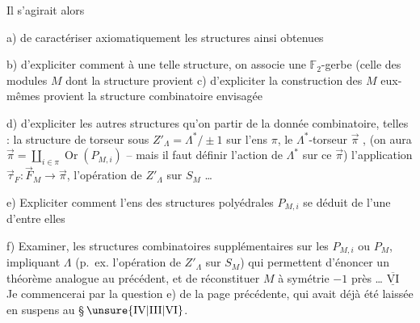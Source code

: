 
Il s'agirait alors

a) de caractériser axiomatiquement les structures ainsi obtenues

b) d'expliciter comment à une telle structure, on associe une $\mathbb F_2$-gerbe
(celle des modules $M$ dont la structure provient
c) d'expliciter la construction des $M$
eux-mêmes  provient la structure
combinatoire envisagée

d) d'expliciter les autres structures qu'on
  partir de la donnée combinatoire, telles : la structure de \deleted{$\Lambda^*$}
torseur sous $Z'_\Lambda=\Lambda^*/\pm1$ sur l'ens $\pi$,
le $\Lambda^*$-torseur $\overrightarrow\pi$ ,
 (on
aura $\overrightarrow\pi=\coprod_{i\in\pi}\operatorname{Or}(P_{M,i})$ -- mais il faut
définir l'action de $\Lambda^*$ sur ce $\overrightarrow\pi$)
l'application $\overrightarrow\tau_F:\overrightarrow F_M\to\overrightarrow\pi$, l'opération
de $Z'_\Lambda$ sur $S_M$ \ldots

e) Expliciter comment l'ens des structures
polyédrales $P_{M,i}$ se déduit de l'une
d'entre elles

f) Examiner,  les structures combinatoires
supplémentaires sur les $P_{M,i}$ ou $P_M$,
impliquant $\Lambda$ (p.~ex. l'opération de
$Z'_\Lambda$ sur $S_M$) qui permettent d'énoncer un théorème analogue
au précédent, et de réconstituer
$M$ à symétrie $-1$ près \ldots
$\overline{\underline{\mathrm{VI}}}$ Je commencerai par la question e)
de la page précédente, qui avait déjà été
laissée en suspens au \S\,$\unsure{\mathrm{IV}|\mathrm{III}|\mathrm{VI}}$.


